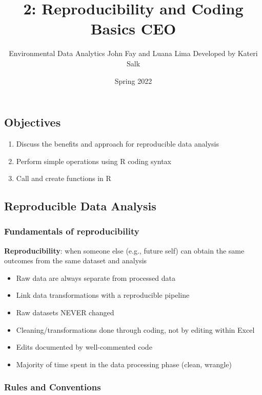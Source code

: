 \documentclass[
]{article}
\title{2: Reproducibility and Coding Basics CEO}
\author{Environmental Data Analytics \textbar{} John Fay and Luana Lima
\textbar{} Developed by Kateri Salk}
\date{Spring 2022}
\providecommand{\tightlist}{%
  \setlength{\itemsep}{0pt}\setlength{\parskip}{0pt}}
\begin{document}
\maketitle

\hypertarget{objectives}{%
\subsection{Objectives}\label{objectives}}

\begin{enumerate}
\def\labelenumi{\arabic{enumi}.}
\tightlist
\item
  Discuss the benefits and approach for reproducible data analysis
\item
  Perform simple operations using R coding syntax
\item
  Call and create functions in R
\end{enumerate}

\hypertarget{reproducible-data-analysis}{%
\subsection{Reproducible Data
Analysis}\label{reproducible-data-analysis}}

\hypertarget{fundamentals-of-reproducibility}{%
\subsubsection{Fundamentals of
reproducibility}\label{fundamentals-of-reproducibility}}

\textbf{Reproducibility}: when someone else (e.g., future self) can
obtain the same outcomes from the same dataset and analysis

\begin{itemize}
\tightlist
\item
  Raw data are always separate from processed data
\item
  Link data transformations with a reproducible pipeline
\item
  Raw datasets NEVER changed
\item
  Cleaning/transformations done through coding, not by editing within
  Excel
\item
  Edits documented by well-commented code
\item
  Majority of time spent in the data processing phase (clean, wrangle)
\end{itemize}

\hypertarget{rules-and-conventions}{%
\subsubsection{Rules and Conventions}\label{rules-and-conventions}}
\end{document}
